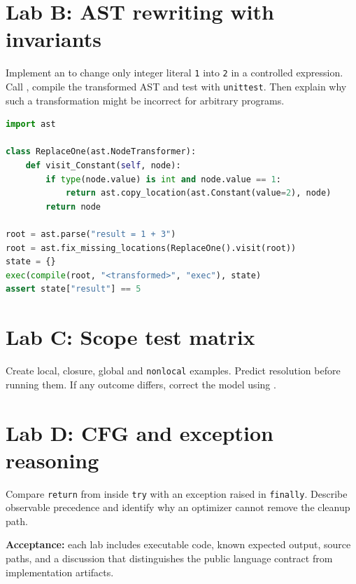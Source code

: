 \documentclass[
  11pt,
]{report}
\newcommand{\passthrough}[1]{#1}
\begin{document}
\section{Lab B: AST rewriting with
invariants}\label{lab-b-ast-rewriting-with-invariants}

Implement an  to change
only integer literal \passthrough{\lstinline!1!} into
\passthrough{\lstinline!2!} in a controlled expression. Call
, compile the
transformed AST and test with \passthrough{\lstinline!unittest!}. Then
explain why such a transformation might be incorrect for arbitrary
programs.

\begin{lstlisting}[language=Python]
import ast

class ReplaceOne(ast.NodeTransformer):
    def visit_Constant(self, node):
        if type(node.value) is int and node.value == 1:
            return ast.copy_location(ast.Constant(value=2), node)
        return node

root = ast.parse("result = 1 + 3")
root = ast.fix_missing_locations(ReplaceOne().visit(root))
state = {}
exec(compile(root, "<transformed>", "exec"), state)
assert state["result"] == 5
\end{lstlisting}

\section{Lab C: Scope test matrix}\label{lab-c-scope-test-matrix}

Create local, closure, global and \passthrough{\lstinline!nonlocal!}
examples. Predict resolution before running them. If any outcome
differs, correct the model using
.

\section{Lab D: CFG and exception
reasoning}\label{lab-d-cfg-and-exception-reasoning}

Compare \passthrough{\lstinline!return!} from inside
\passthrough{\lstinline!try!} with an exception raised in
\passthrough{\lstinline!finally!}. Describe observable precedence and
identify why an optimizer cannot remove the cleanup path.

\textbf{Acceptance:} each lab includes executable code, known expected
output, source paths, and a discussion that distinguishes the public
language contract from implementation artifacts.
\end{document}
